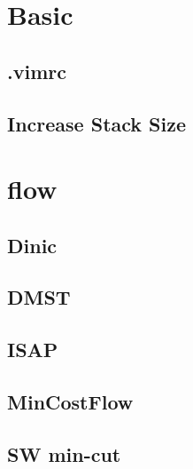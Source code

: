 \documentclass[10pt,twocolumn,oneside]{article}
\begin{document}
\pagestyle{fancy}
\fancyfoot{}
\fancyhead[R]{\thepage}
\renewcommand{\headrulewidth}{0.4pt}
\renewcommand{\contentsname}{Contents} 

\scriptsize
\tableofcontents

\newpage

\section{Basic}
\subsection{.vimrc}


\subsection{Increase Stack Size}


\section{flow}
\subsection{Dinic}


\subsection{DMST}


\subsection{ISAP}


\subsection{MinCostFlow}


\newpage

\subsection{SW min-cut}

\end{document}
